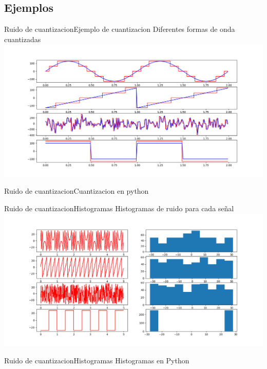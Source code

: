  \subsection{Ejemplos}
 \begin{frame}{Ruido de cuantizacion}{Ejemplo de cuantizacion}
    Diferentes formas de onda cuantizadas
    \center\includegraphics[width=1\textwidth]{1_clase/noise_examples}
    \vfill
 \end{frame}
 \begin{frame}{Ruido de cuantizacion}{Cuantizacion en python}
    \handsonicon
    
    \vfill
 \end{frame}
 \begin{frame}{Ruido de cuantizacion}{Histogramas}
    Histogramas de ruido para cada señal
    \center\includegraphics[width=1\textwidth]{1_clase/noise_histogram}
    \vfill
 \end{frame}
 \begin{frame}{Ruido de cuantizacion}{Histogramas}
    Histogramas en Python
    \handsonicon
    
    \vfill
 \end{frame}
